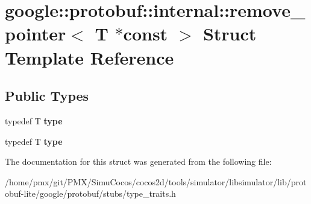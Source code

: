 \hypertarget{structgoogle_1_1protobuf_1_1internal_1_1remove__pointer_3_01T_01_5const_01_4}{}\section{google\+:\+:protobuf\+:\+:internal\+:\+:remove\+\_\+pointer$<$ T $\ast$const $>$ Struct Template Reference}
\label{structgoogle_1_1protobuf_1_1internal_1_1remove__pointer_3_01T_01_5const_01_4}
\subsection*{Public Types}
\begin{DoxyCompactItemize}
\item 
\mbox{\label{structgoogle_1_1protobuf_1_1internal_1_1remove__pointer_3_01T_01_5const_01_4_a15a85267c88d5867ca9e6aa471185075}} 
typedef T {\bfseries type}
\item 
\mbox{\label{structgoogle_1_1protobuf_1_1internal_1_1remove__pointer_3_01T_01_5const_01_4_a15a85267c88d5867ca9e6aa471185075}} 
typedef T {\bfseries type}
\end{DoxyCompactItemize}


The documentation for this struct was generated from the following file\+:\begin{DoxyCompactItemize}
\item 
/home/pmx/git/\+P\+M\+X/\+Simu\+Cocos/cocos2d/tools/simulator/libsimulator/lib/protobuf-\/lite/google/protobuf/stubs/type\+\_\+traits.\+h\end{DoxyCompactItemize}
